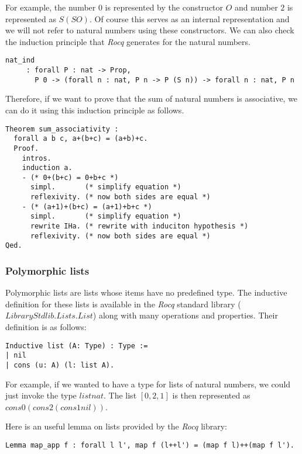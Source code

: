For example, the number $0$ is represented by the constructor \lst$O$ and number $2$ is represented as \lst$S (S O)$.
Of course this serves as an internal representation and we will not refer to natural numbers using these constructors.
We can also check the induction principle that \textit{Rocq} generates for the natural numbers.
\begin{lstlisting}[language=Coq]
  nat_ind
     : forall P : nat -> Prop,
       P 0 -> (forall n : nat, P n -> P (S n)) -> forall n : nat, P n
\end{lstlisting}

Therefore, if we want to prove that the sum of natural numbers is associative, we can do it using this induction principle as follows.
\begin{lstlisting}[language=Coq]
Theorem sum_associativity :
  forall a b c, a+(b+c) = (a+b)+c.
  Proof.
    intros.
    induction a.
    - (* 0+(b+c) = 0+b+c *)
      simpl.       (* simplify equation *)
      reflexivity. (* now both sides are equal *)        
    - (* (a+1)+(b+c) = (a+1)+b+c *)
      simpl.       (* simplify equation *)
      rewrite IHa. (* rewrite with induciton hypothesis *)
      reflexivity. (* now both sides are equal *)
Qed.
\end{lstlisting}

\subsubsection{Polymorphic lists}
Polymorphic lists are lists whose items have no predefined type.
The inductive definition for these lists is available in the \textit{Rocq} standard library (\lst$Library Stdlib.Lists.List$) along with many operations and properties.
Their definition is as follows: 

\begin{lstlisting}[language=Coq]
Inductive list (A: Type) : Type :=
| nil
| cons (u: A) (l: list A).
\end{lstlisting}

For example, if we wanted to have a type for lists of natural numbers, we could just invoke the type \lst$list nat$.
The list \lst$[0,2,1]$ is then represented as \lst$cons 0 (cons 2 (cons 1 nil))$.

Here is an useful lemma on lists provided by the \textit{Rocq} library:
\begin{lstlisting}[language=Coq]
Lemma map_app f : forall l l', map f (l++l') = (map f l)++(map f l').
\end{lstlisting}


